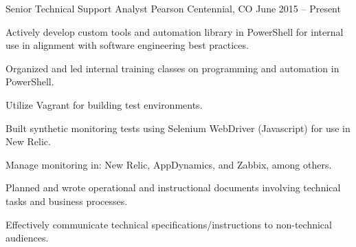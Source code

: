\cventry
{Senior Technical Support Analyst} %
{Pearson} %
{Centennial, CO} %
{June 2015 – Present} %
{
  	\begin{cvitems} %
        \item {Actively develop custom tools and automation library in PowerShell for internal use in alignment with software engineering best practices.}
		\item {Organized and led internal training classes on programming and automation in PowerShell.}
		\item {Utilize Vagrant for building test environments.}
		\item {Built synthetic monitoring tests using Selenium WebDriver (Javascript) for use in New Relic.}
		\item {Manage monitoring in: New Relic, AppDynamics, and Zabbix, among others.}
		\item {Planned and wrote operational and instructional documents involving technical tasks and business processes.}
		\item {Effectively communicate technical specifications/instructions to non-technical audiences.}
	\end{cvitems}
}